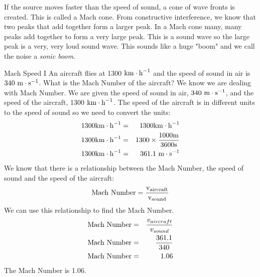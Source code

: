 If the source moves faster than the speed of sound, a cone of wave fronts is created. This is called a Mach cone. From constructive interference, we know that two peaks that add together form a larger peak. In a Mach cone many, many peaks add together to form a very large peak. This is a sound wave so the large peak is a very, very loud sound wave. This sounds like a huge "boom" and we call the noise a \emph{sonic boom}.  


\begin{wex}{Mach Speed I}
{An aircraft flies at 1300 $\rm{km\cdot h}^{-1}$ and the speed of sound in air is $340\ \rm{m\cdot s}^{-1}$. What is the Mach Number of the aircraft?}
{
We know we are dealing with Mach Number. We are given the speed of sound in air, $340\ \rm{m\cdot s}^{-1}$, and the speed of the aircraft, 1300 $\rm{km\cdot h}^{-1}$. The speed of the aircraft is in different units to the speed of sound so we need to convert the units:
\begin{eqnarray*}
1300 \rm{km\cdot h}^{-1} & = & 1300 \rm{km\cdot h}^{-1} \\
1300 \rm{km\cdot h}^{-1} & = & 1300 \times \frac{1000\rm{m}}{3600\rm{s}} \\
1300 \rm{km\cdot h}^{-1} & = & 361.1\ \rm{m\cdot s}^{-1}
\end{eqnarray*}
We know that there is a relationship between the Mach Number, the speed of sound and the speed of the aircraft:
\begin{equation*}
\rm{Mach\ Number} = \frac{v_{aircraft}}{v_{sound}}
\end{equation*}
We can use this relationship to find the Mach Number.
\begin{eqnarray*}
\rm{Mach\ Number} &=& \frac{v_{aircraft}}{v_{sound}} \\
\rm{Mach\ Number} &=& \frac{361.1}{340} \\
\rm{Mach\ Number} &=& 1.06 \\
\end{eqnarray*}
The Mach Number is 1.06.
}
\end{wex}


